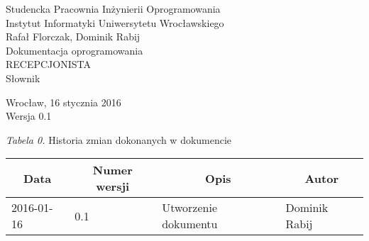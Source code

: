 \documentclass [11pt, a4paper, leqno] {article}
\begin{document}

\begin{center}
  \thispagestyle{empty} %
  {\large Studencka Pracownia Inżynierii Oprogramowania} \\ [0.5cm]
	{\large Instytut Informatyki Uniwersytetu Wrocławskiego} \\ [6.0cm]

  {\large Rafał Florczak, Dominik Rabij} \\ [1.5cm]

	{\huge Dokumentacja oprogramowania} \\ [0.5cm]
  {\huge RECEPCJONISTA} \\ [1.5cm]

  {\large Słownik} \\ [0.5cm]

  \vfill
  
  {\large Wrocław, 16 stycznia 2016} \\ [0.5cm]
  {\large Wersja 0.1}
\end{center}

\newpage


\textit{Tabela 0.} Historia zmian dokonanych w dokumencie

\begin{center}
  \begin{tabular}{| l | l | l | l |}
    \hline
    \multicolumn{1}{|c|}{Data} & 
    \multicolumn{1}{|c|}{Numer wersji} &  
    \multicolumn{1}{|c|}{Opis} &
    \multicolumn{1}{|c|}{Autor} \\ \hline \hline
    2016-01-16 & 0.1 & Utworzenie dokumentu & Dominik Rabij \\ \hline
  \end{tabular}
\end{center}



\newpage
\end{document}

